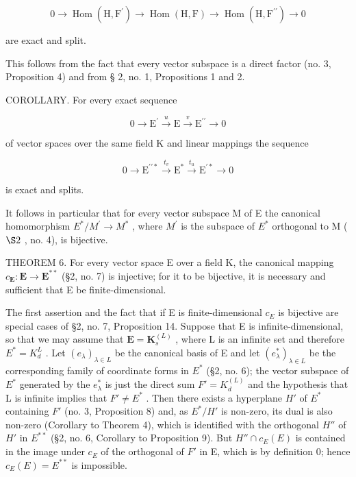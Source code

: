 \[
0 \rightarrow \operatorname{Hom} (\mathrm{H}, \mathrm{F} ^ {\prime}) \rightarrow \operatorname{Hom} (\mathrm{H}, \mathrm{F}) \rightarrow \operatorname{Hom} (\mathrm{H}, \mathrm{F} ^ {\prime \prime}) \rightarrow 0
\]

are exact and split.

This follows from the fact that every vector subspace is a direct factor (no. 3, Proposition 4) and from § 2, no. 1, Propositions 1 and 2.

COROLLARY. For every exact sequence

\[
0 \longrightarrow \mathrm{E} ^ {\prime} \stackrel {u} {\longrightarrow} \mathrm{E} \stackrel {v} {\longrightarrow} \mathrm{E} ^ {\prime \prime} \longrightarrow 0
\]

of vector spaces over the same field K and linear mappings the sequence

\[
0 \longrightarrow \mathrm{E} ^ {\prime \prime *} \stackrel {t _ {v}} {\longrightarrow} \mathrm{E} ^ {*} \stackrel {t _ {u}} {\longrightarrow} \mathrm{E} ^ {\prime *} \longrightarrow 0
\]

is exact and splits.

It follows in particular that for every vector subspace M of E the canonical homomorphism \(E^{*}/M^{\prime} \rightarrow M^{*}\) , where \(M^{\prime}\) is the subspace of \(E^{*}\) orthogonal to M ( \(\S 2\) , no. 4), is bijective.

THEOREM 6. For every vector space E over a field K, the canonical mapping \(c_{\mathbf{E}}: \mathbf{E} \to \mathbf{E}^{**}\) (§2, no. 7) is injective; for it to be bijective, it is necessary and sufficient that E be finite-dimensional.

The first assertion and the fact that if E is finite-dimensional \(c_{E}\) is bijective are special cases of §2, no. 7, Proposition 14. Suppose that E is infinite-dimensional, so that we may assume that \(\mathbf{E} = \mathbf{K}_{s}^{(L)}\) , where L is an infinite set and therefore \(E^{*} = K_{d}^{L}\) . Let \((e_{\lambda})_{\lambda \in L}\) be the canonical basis of E and let \((e_{\lambda}^{*})_{\lambda \in L}\) be the corresponding family of coordinate forms in \(E^{*}\) (§2, no. 6); the vector subspace of \(E^{*}\) generated by the \(e_{\lambda}^{*}\) is just the direct sum \(F' = K_{d}^{(L)}\) and the hypothesis that L is infinite implies that \(F' \neq E^{*}\) . Then there exists a hyperplane \(H'\) of \(E^{*}\) containing \(F'\) (no. 3, Proposition 8) and, as \(E^{*}/H'\) is non-zero, its dual is also non-zero (Corollary to Theorem 4), which is identified with the orthogonal \(H''\) of \(H'\) in \(E^{**}\) (§2, no. 6, Corollary to Proposition 9). But \(H'' \cap c_{E}(E)\) is contained in the image under \(c_{E}\) of the orthogonal of \(F'\) in E, which is by definition 0; hence \(c_{E}(E) = E^{**}\) is impossible.

